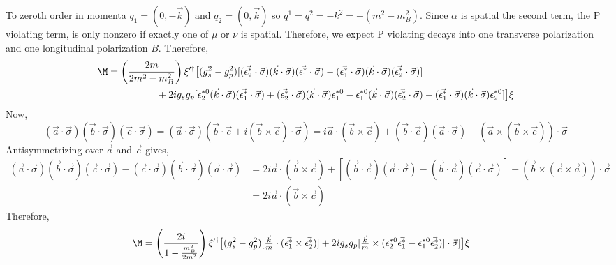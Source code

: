 \documentclass[12pt]{article}
\begin{document}
To zeroth order in momenta $q_1 = (0, -\vec{k})$ and $q_2 = (0, \vec{k})$ so $q^1 = q^2 = -k^2 = -(m^2 - m_B^2)$. Since $\alpha$ is spatial the second term, the P violating term, is only nonzero if exactly one of $\mu$ or $\nu$ is spatial. Therefore, we expect P violating decays into one transverse polarization and one longitudinal polarization $B$. Therefore, 
\begin{align*}
\M & = \left( \frac{2m}{2 m^2 - m_B^2} \right) \xi'^{\dagger} \big[ (g_s^2 - g_p^2) [(\vec{\epsilon_2^*} \cdot \vec{\sigma}) (\vec{k} \cdot \vec{\sigma}) (\vec{\epsilon_1^*} \cdot \vec{\sigma}) - (\vec{\epsilon_1^*} \cdot \vec{\sigma}) (\vec{k} \cdot \vec{\sigma}) (\vec{\epsilon_2^*} \cdot \vec{\sigma})]
\\
& \quad \quad \quad \quad \quad + 2i g_s g_p [\epsilon_2^{*0} (\vec{k} \cdot \vec{\sigma})(\vec{\epsilon_1^*} \cdot \vec{\sigma}) + (\vec{\epsilon_2^*} \cdot \vec{\sigma}) (\vec{k} \cdot \vec{\sigma})  \epsilon_1^{*0} - \epsilon_1^{*0} (\vec{k} \cdot \vec{\sigma})(\vec{\epsilon_2^*} \cdot \vec{\sigma}) - (\vec{\epsilon_1^*} \cdot \vec{\sigma}) (\vec{k} \cdot \vec{\sigma})  \epsilon_2^{*0}]  \big] \xi
\end{align*}
Now,
\[ (\vec{a} \cdot \vec{\sigma})(\vec{b} \cdot \vec{\sigma}) (\vec{c} \cdot \vec{\sigma}) = (\vec{a} \cdot \vec{\sigma})(\vec{b} \cdot \vec{c} + i (\vec{b} \times \vec{c})\cdot \vec{\sigma}) = i \vec{a} \cdot (\vec{b} \times \vec{c}) + (\vec{b} \cdot \vec{c}) (\vec{a} \cdot \vec{\sigma}) - (\vec{a} \times (\vec{b} \times \vec{c})) \cdot \vec{\sigma} \]
Antisymmetrizing over $\vec{a}$ and $\vec{c}$ gives,
\begin{align*}
(\vec{a} \cdot \vec{\sigma})(\vec{b} \cdot \vec{\sigma}) (\vec{c} \cdot \vec{\sigma}) - (\vec{c} \cdot \vec{\sigma})(\vec{b} \cdot \vec{\sigma}) (\vec{a} \cdot \vec{\sigma}) & = 2i \vec{a} \cdot (\vec{b} \times \vec{c}) + [ (\vec{b} \cdot \vec{c}) (\vec{a} \cdot \vec{\sigma}) - (\vec{b} \cdot \vec{a}) (\vec{c} \cdot \vec{\sigma})] + (\vec{b} \times (\vec{c} \times \vec{a})) \cdot \vec{\sigma}
\\
& = 2i \vec{a} \cdot (\vec{b} \times \vec{c})
\end{align*}
Therefore, 
\begin{align*}
\M & = \left( \frac{2i}{1 - \frac{m_B^2}{2m^2}} \right) \xi'^{\dagger} \big[ (g_s^2 - g_p^2) [\tfrac{\vec{k}}{m} \cdot ( \vec{\epsilon_1^*} \times \vec{\epsilon_2^*})] + 2 i g_s g_p [ \tfrac{\vec{k}}{m} \times ( \epsilon_2^{*0}  \vec{\epsilon_1^*} - \epsilon_1^{*0} \vec{\epsilon_2^*})] \cdot \vec{\sigma} ] \big] \xi
\end{align*}
\end{document}
